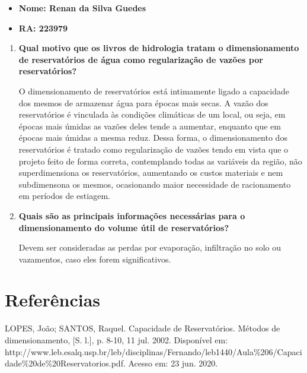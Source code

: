 \documentclass[a4paper, 12pt]{article}
\newcommand{\tbf}[1]{\textbf{#1}}
\begin{document}
	\begin{itemize}
		\item\tbf{Nome: Renan da Silva Guedes}
		\item\tbf{RA: 223979}
	\end{itemize}

	\begin{enumerate}
		\item\tbf{Qual motivo que os livros de hidrologia tratam o dimensionamento de reservatórios de água como regularização de vazões por reservatórios?}
		
		O dimensionamento de reservatórios está intimamente ligado a capacidade dos mesmos de armazenar água para épocas mais secas. A vazão dos reservatórios é vinculada às condições climáticas de um local, ou seja, em épocas mais úmidas as vazões deles tende a aumentar, enquanto que em épocas mais úmidas a mesma reduz. Dessa forma, o dimensionamento dos reservatórios é tratado como regularização de vazões tendo em vista que o projeto feito de forma correta, contemplando todas as variáveis da região, não superdimensiona os reservatórios, aumentando os custos materiais e nem subdimensona os mesmos, ocasionando maior necessidade de racionamento em períodos de estiagem.
		
		\item\tbf{Quais são as principais informações necessárias para o dimensionamento do volume útil de reservatórios?}
		
		Devem ser consideradas as perdas por evaporação, infiltração no solo ou vazamentos, caso eles forem significativos.
	\end{enumerate}

	\section{Referências}
	
	LOPES, João; SANTOS, Raquel. Capacidade de Reservatórios. Métodos de dimensionamento, [S. l.], p. 8-10, 11 jul. 2002. Disponível em: http://www.leb.esalq.usp.br/leb/disciplinas/Fernando\newline /leb1440/Aula\%206/Capacidade\%20de\%20Reservatorios.pdf. Acesso em: 23 jun. 2020.
\end{document}
